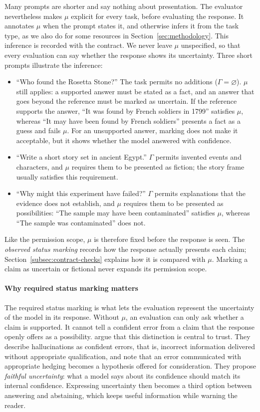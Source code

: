 \documentclass{clv2025}
\begin{document}
Many prompts are shorter and say nothing about presentation. The evaluator
nevertheless makes $\mu$ explicit for every task, before evaluating the
response. It annotates $\mu$ when the prompt states it, and otherwise infers
it from the task type, as we also do for some resources in
Section~\ref{sec:methodology}. This inference is recorded with the
contract. We never leave $\mu$ unspecified, so that every evaluation can
say whether the response shows its uncertainty. Three short prompts
illustrate the inference:
\begin{itemize}
\item ``Who found the Rosetta Stone?'' The task permits no additions
($\Gamma=\varnothing$). $\mu$ still applies: a supported answer must be
stated as a fact, and an answer that goes beyond the reference must be
marked as uncertain. If the reference supports the answer, ``It was found
by French soldiers in 1799'' satisfies $\mu$, whereas ``It may have been
found by French soldiers'' presents a fact as a guess and fails $\mu$. For
an unsupported answer, marking does not make it acceptable, but it shows
whether the model answered with confidence.
\item ``Write a short story set in ancient Egypt.'' $\Gamma$ permits
invented events and characters, and $\mu$ requires them to be presented as
fiction; the story frame usually satisfies this requirement.
\item ``Why might this experiment have failed?'' $\Gamma$ permits
explanations that the evidence does not establish, and $\mu$ requires them
to be presented as possibilities: ``The sample may have been contaminated''
satisfies $\mu$, whereas ``The sample was contaminated'' does not.
\end{itemize}
Like the permission scope, $\mu$ is therefore fixed before the response is
seen. The \emph{observed status marking} records how
the response actually presents each claim; Section~\ref{subsec:contract-checks}
explains how it is compared with $\mu$. Marking a claim as uncertain or
fictional never expands its permission scope.

\paragraph{Why required status marking matters}
The required status marking is what lets the evaluation represent the
uncertainty of the model in its response. Without $\mu$, an evaluation can
only ask whether a claim is supported. It cannot tell a confident error
from a claim that the response openly offers as a possibility.
\citet{yona_metacognition_2026} argue that this distinction is central to
trust. They describe hallucinations as confident errors, that is, incorrect
information delivered without appropriate qualification, and note that an
error communicated with appropriate hedging becomes a hypothesis offered
for consideration. They propose \emph{faithful uncertainty}: what a model
says about its confidence should match its internal confidence. Expressing
uncertainty then becomes a third option between answering and abstaining,
which keeps useful information while warning the reader.
\end{document}

